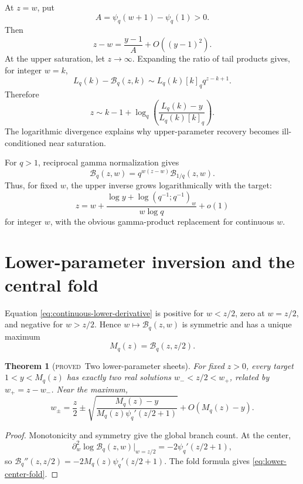 \documentclass[11pt,letterpaper,oneside,openany]{book}
\newtheorem{theorem}{Theorem}[chapter]
\theoremstyle{definition}
\theoremstyle{remark}
\newcommand{\statusproved}{\textcolor{provedgreen}{\textsc{proved}}}
\newcommand{\Bcal}{\mathcal B}
\begin{document}
At \(z=w\), put
\[
 A=\psi_q(w+1)-\psi_q(1)>0.
\]
Then
\[
 z-w=\frac{y-1}{A}+O((y-1)^2).
\]
At the upper saturation, let \(z\to\infty\).  Expanding the ratio of tail
products gives, for integer \(w=k\),
\begin{equation}\label{eq:fixed-k-upper-inverse}
 L_q(k)-\Bcal_q(z,k)
 \sim L_q(k)[k]_q q^{z-k+1}.
\end{equation}
Therefore
\begin{equation}\label{eq:fixed-k-n-inverse}
 z\sim k-1+\log_q
 \left(\frac{L_q(k)-y}{L_q(k)[k]_q}\right).
\end{equation}
The logarithmic divergence explains why upper-parameter recovery becomes
ill-conditioned near saturation.

For \(q>1\), reciprocal gamma normalization gives
\begin{equation}\label{eq:continuous-gaussian-reciprocity}
 \Bcal_q(z,w)=q^{w(z-w)}\Bcal_{1/q}(z,w).
\end{equation}
Thus, for fixed \(w\), the upper inverse grows logarithmically with the target:
\[
 z=w+\frac{\log y+\log(q^{-1};q^{-1})_w}{w\log q}+o(1)
\]
for integer \(w\), with the obvious gamma-product replacement for continuous
\(w\).

\section{Lower-parameter inversion and the central fold}
Equation \eqref{eq:continuous-lower-derivative} is positive for \(w<z/2\), zero
at \(w=z/2\), and negative for \(w>z/2\).  Hence
\(w\mapsto\Bcal_q(z,w)\) is symmetric and has a unique maximum
\[
 M_q(z)=\Bcal_q(z,z/2).
\]

\begin{theorem}[\statusproved\ Two lower-parameter sheets]
For fixed \(z>0\), every target \(1<y<M_q(z)\) has exactly two real solutions
\(w_-<z/2<w_+\), related by \(w_+=z-w_-\).  Near the maximum,
\begin{equation}\label{eq:lower-center-fold}
 w_\pm=\frac z2\pm
 \sqrt{\frac{M_q(z)-y}{M_q(z)\psi_q'(z/2+1)}}
 +O(M_q(z)-y).
\end{equation}
\end{theorem}
\begin{proof}
Monotonicity and symmetry give the global branch count.  At the center,
\[
 \partial_w^2\log\Bcal_q(z,w)|_{w=z/2}
 =-2\psi_q'(z/2+1),
\]
so
\(\Bcal_q''(z,z/2)=-2M_q(z)\psi_q'(z/2+1)\).  The fold formula gives
\eqref{eq:lower-center-fold}.
\end{proof}
\end{document}
